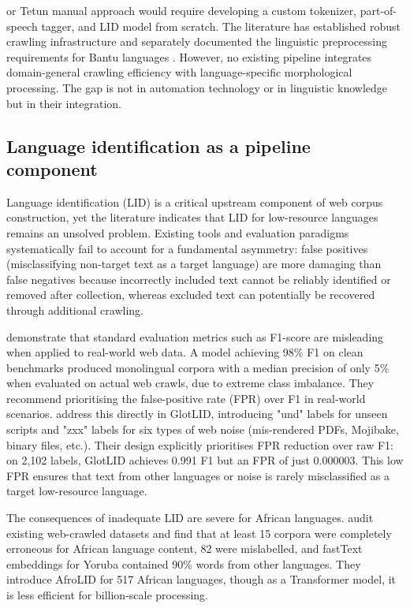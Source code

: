 \documentclass[12pt]{ThesisRU}
\begin{document}
or Tetun manual approach would require developing a custom tokenizer, part-of-speech tagger, and LID model from scratch. The literature has established robust crawling infrastructure \citep{suchomel2020better, de2024data} and separately documented the linguistic preprocessing requirements for Bantu languages \citet{nchabeleng2020evaluating}. However, no existing pipeline integrates domain-general crawling efficiency with language-specific morphological processing. The gap is not in automation technology or in linguistic knowledge but in their integration.

\subsection{Language identification as a pipeline component}
Language identification (LID) is a critical upstream component of web corpus construction, yet the literature indicates that LID for low-resource languages remains an unsolved problem. Existing tools and evaluation paradigms systematically fail to account for a fundamental asymmetry: false positives (misclassifying non-target text as a target language) are more damaging than false negatives because incorrectly included text cannot be reliably identified or removed after collection, whereas excluded text can potentially be recovered through additional crawling.

\citet{kreutzer-etal-2022-quality} demonstrate that standard evaluation metrics such as F1-score are misleading when applied to real-world web data. A model achieving 98\% F1 on clean benchmarks produced monolingual corpora with a median precision of only 5\% when evaluated on actual web crawls, due to extreme class imbalance. They recommend prioritising the false-positive rate (FPR) over F1 in real-world scenarios. \citet{kargaran2024glotcc} address this directly in GlotLID, introducing "und" labels for unseen scripts and "zxx" labels for six types of web noise (mis-rendered PDFs, Mojibake, binary files, etc.). Their design explicitly prioritises FPR reduction over raw F1: on 2,102 labels, GlotLID achieves 0.991 F1 but an FPR of just 0.000003. This low FPR ensures that text from other languages or noise is rarely misclassified as a target low-resource language.

The consequences of inadequate LID are severe for African languages. \citet{adebara2022afrolid} audit existing web-crawled datasets and find that at least 15 corpora were completely erroneous for African language content, 82 were mislabelled, and fastText embeddings for Yoruba contained 90\% words from other languages. They introduce AfroLID for 517 African languages, though as a Transformer model, it is less efficient for billion-scale processing.
\end{document}
